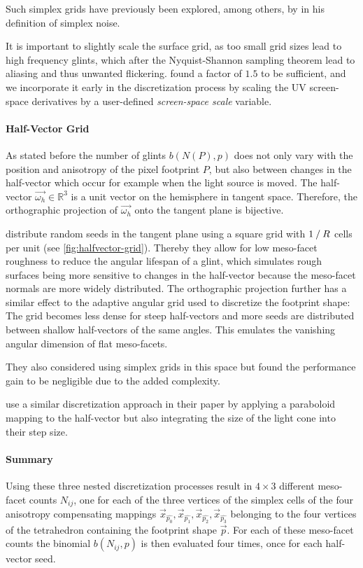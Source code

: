 Such simplex grids have previously been explored, among others, by \textcite{perlin2001} in his definition of simplex noise.

It is important to slightly scale the surface grid, as too small grid sizes lead to high frequency glints, which after the Nyquist-Shannon sampling theorem lead to aliasing and thus unwanted flickering.
%
\textcite{deliot2023} found a factor of $1.5$ to be sufficient, and we incorporate it early in the discretization process by scaling the UV screen-space derivatives by a user-defined \emph{screen-space scale} variable.


\paragraph{Half-Vector Grid}
%
As stated before the number of glints $b(N(P),p)$ does not only vary with the position and anisotropy of the pixel footprint $P$, but also between changes in the half-vector which occur for example when the light source is moved.
%
The half-vector $\vec{\omega_h} \in \mathbb{R}^3$ is a unit vector on the hemisphere in tangent space.
%
Therefore, the orthographic projection of $\vec{\omega_h}$ onto the tangent plane is bijective.



\textcite{deliot2023} distribute random seeds in the tangent plane using a square grid with $1\mathbin{/}R$ cells per unit (see \cref{fig:halfvector-grid}).
%
Thereby they allow for low meso-facet roughness to reduce the angular lifespan of a glint, which simulates rough surfaces being more sensitive to changes in the half-vector because the meso-facet normals are more widely distributed.
%
The orthographic projection further has a similar effect to the adaptive angular grid used to discretize the footprint shape: 
%
The grid becomes less dense for steep half-vectors and more seeds are distributed between shallow half-vectors of the same angles.
%
This emulates the vanishing angular dimension of flat meso-facets.


They also considered using simplex grids in this space but found the performance gain to be negligible due to the added complexity.


\textcite{zirr2016} use a similar discretization approach in their paper by applying a paraboloid mapping to the half-vector but also integrating the size of the light cone into their step size.


\paragraph{Summary}
%
Using these three nested discretization processes \textcite{deliot2023} result in $4\times3$ different meso-facet counts $N_{ij}$, one for each of the three vertices of the simplex cells of the four anisotropy compensating mappings $\vec{x}_{\hat{p_0}}, \vec{x}_{\hat{p_1}}, \vec{x}_{\hat{p_2}}, \vec{x}_{\hat{p_3}}$ belonging to the four vertices of the tetrahedron containing the footprint shape $\vec{p}$. 
%
For each of these meso-facet counts the binomial $b(N_{ij}, p)$ is then evaluated four times, once for each half-vector seed.